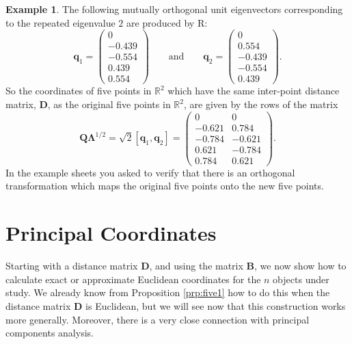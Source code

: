 \documentclass[]{book}
\theoremstyle{definition}
\theoremstyle{definition}
\newtheorem{example}{Example}[chapter]
\theoremstyle{definition}
\theoremstyle{remark}
\begin{document}
\begin{example}
The following mutually orthogonal unit eigenvectors corresponding to the repeated eigenvalue \(2\)
are produced by R:
\[
\boldsymbol q_1= \begin{pmatrix}0 \\ -0.439 \\ -0.554 \\ 0.439 \\ 0.554 \end{pmatrix} \qquad
\text{and} \qquad \boldsymbol q_2 =\begin{pmatrix}0 \\ 0.554 \\ -0.439 \\ -0.554\\ 0.439 \end{pmatrix}.
\]
So the coordinates of five points in \(\mathbb{R}^2\) which have the same inter-point distance matrix, \(\boldsymbol D\), as the original five points in \(\mathbb{R}^2\), are given by the rows of the matrix
\[
\boldsymbol Q\boldsymbol \Lambda^{1/2}=\sqrt{2}[\boldsymbol q_1 , \boldsymbol q_2]=
\begin{pmatrix}
0&0\\
-0.621 & 0.784\\
-0.784 & -0.621\\
0.621 & -0.784\\
0.784 & 0.621
\end{pmatrix}.
\]
In the example sheets you asked to verify that there is an orthogonal transformation which maps the original five points onto the new five points.
\end{example}

\hypertarget{principal-coordinates}{%
\section{Principal Coordinates}\label{principal-coordinates}}

Starting with a distance matrix \(\boldsymbol D\), and using the matrix \(\boldsymbol B\), we now show how to calculate exact or approximate Euclidean coordinates for the \(n\) objects under study. We already know from Proposition \ref{prp:five1} how to do this when the distance matrix \(\boldsymbol D\) is Euclidean, but we will see now that this construction works more generally. Moreover, there is a very close connection with principal components analysis.
\end{document}
